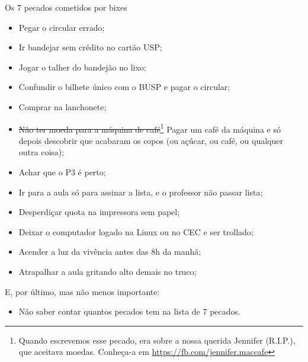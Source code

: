 \begin{editorial}{Os 7 pecados cometidos por bixes}
\begin{itemize}
  \item Pegar o circular errado;
  \item Ir bandejar sem crédito no cartão USP;
  \item Jogar o talher do bandejão no lixo;
  \item Confundir o bilhete único com o BUSP e pagar o circular;
  \item Comprar na lanchonete;
  \item \sout{Não ter moeda para a máquina de café}\footnote{Quando escrevemos
    esse pecado, era sobre a nossa querida Jennifer (R.I.P.), que aceitava
    moedas. Conheça-a em \url{https://fb.com/jennifer.maccafe}} Pagar um café da
    máquina e só depois descobrir que acabaram os copos (ou açúcar, ou café,
    ou qualquer outra coisa);
  \item Achar que o P3 é perto;
  \item Ir para a aula só para assinar a lista, e o professor não passar lista;
  \item Desperdiçar quota na impressora sem papel;
  \item Deixar o computador logado na Linux ou no CEC e ser trollado;
  \item Acender a luz da vivência antes das 8h da manhã;
  \item Atrapalhar a aula gritando alto demais no truco;
\end{itemize}
E, por último, mas não menos importante:
\begin{itemize}
  \item Não saber contar quantos pecados tem na lista de 7 pecados.
\end{itemize}

\end{editorial}
